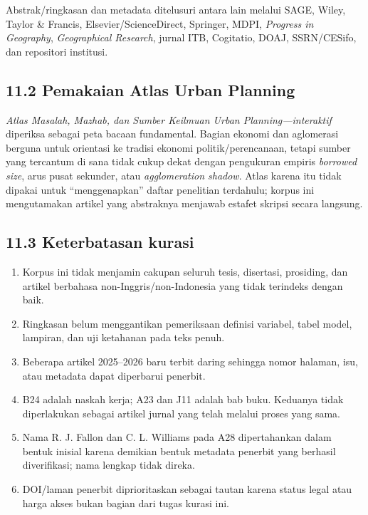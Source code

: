 \documentclass[
  indonesian,
  11pt,
  a4paper,
  oneside,
  openany]{report}
\providecommand{\tightlist}{%
  \setlength{\itemsep}{0pt}\setlength{\parskip}{0pt}}
\begin{document}
Abstrak/ringkasan dan metadata ditelusuri antara lain melalui SAGE,
Wiley, Taylor \& Francis, Elsevier/ScienceDirect, Springer, MDPI,
\emph{Progress in Geography}, \emph{Geographical Research}, jurnal ITB,
Cogitatio, DOAJ, SSRN/CESifo, dan repositori institusi.

\subsection{11.2 Pemakaian Atlas Urban
Planning}\label{pemakaian-atlas-urban-planning}

\emph{Atlas Masalah, Mazhab, dan Sumber Keilmuan Urban
Planning---interaktif} diperiksa sebagai peta bacaan fundamental. Bagian
ekonomi dan aglomerasi berguna untuk orientasi ke tradisi ekonomi
politik/perencanaan, tetapi sumber yang tercantum di sana tidak cukup
dekat dengan pengukuran empiris \emph{borrowed size}, arus pusat
sekunder, atau \emph{agglomeration shadow}. Atlas karena itu tidak
dipakai untuk ``menggenapkan'' daftar penelitian terdahulu; korpus ini
mengutamakan artikel yang abstraknya menjawab estafet skripsi secara
langsung.

\subsection{11.3 Keterbatasan kurasi}\label{keterbatasan-kurasi}

\begin{enumerate}
\def\labelenumi{\arabic{enumi}.}
\tightlist
\item
  Korpus ini tidak menjamin cakupan seluruh tesis, disertasi, prosiding,
  dan artikel berbahasa non-Inggris/non-Indonesia yang tidak terindeks
  dengan baik.
\item
  Ringkasan belum menggantikan pemeriksaan definisi variabel, tabel
  model, lampiran, dan uji ketahanan pada teks penuh.
\item
  Beberapa artikel 2025--2026 baru terbit daring sehingga nomor halaman,
  isu, atau metadata dapat diperbarui penerbit.
\item
  B24 adalah naskah kerja; A23 dan J11 adalah bab buku. Keduanya tidak
  diperlakukan sebagai artikel jurnal yang telah melalui proses yang
  sama.
\item
  Nama R. J. Fallon dan C. L. Williams pada A28 dipertahankan dalam
  bentuk inisial karena demikian bentuk metadata penerbit yang berhasil
  diverifikasi; nama lengkap tidak direka.
\item
  DOI/laman penerbit diprioritaskan sebagai tautan karena status legal
  atau harga akses bukan bagian dari tugas kurasi ini.
\end{enumerate}
\end{document}
